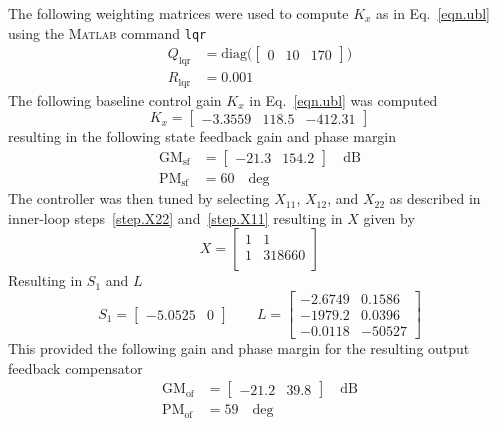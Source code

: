 The following weighting matrices were used to compute $K_{x}$ as in Eq.\ \eqref{eqn.ubl} using the \textsc{Matlab} command \texttt{lqr}
\begin{equation*}
  \begin{aligned}
    Q_{\text{lqr}}&=\text{diag}\bigr(
    \begin{bmatrix}
      0 & 10 & 170
    \end{bmatrix}
    \bigr) \\
    R_{\text{lqr}}&=0.001
  \end{aligned}
\end{equation*}
The following baseline control gain $K_{x}$ in Eq.\ \eqref{eqn.ubl} was computed
\begin{equation*}
  K_{x} =
  \begin{bmatrix}
    -3.3559 & 118.5 & -412.31
  \end{bmatrix}
\end{equation*}
resulting in the following state feedback gain and phase margin
\begin{equation*}
  \begin{aligned}
    \text{GM}_{\text{sf}} &=
    \begin{bmatrix}
      -21.3 & 154.2
    \end{bmatrix}
    \quad \text{dB}\\
    \text{PM}_{\text{sf}} &=
    60
    \quad \text{deg}
  \end{aligned}
\end{equation*}
The controller was then tuned by selecting $X_{11}$, $X_{12}$, and $X_{22}$ as described in inner-loop steps~\ref{step.X22} and~\ref{step.X11} resulting in $X$ given by
\begin{equation*}
  X=
  \begin{bmatrix}
    1 & 1 \\
    1 & 318660 \\
  \end{bmatrix}
\end{equation*}
Resulting in $S_{1}$ and $L$
\begin{equation*}
  S_{1} =
  \begin{bmatrix}
    -5.0525 & 0
  \end{bmatrix}
  \qquad
  L =
  \begin{bmatrix}
    -2.6749 & 0.1586 \\
    -1979.2 & 0.0396 \\
    -0.0118 & -50527
  \end{bmatrix}
\end{equation*}
This provided the following gain and phase margin for the resulting output feedback compensator
\begin{equation*}
  \begin{aligned}
    \text{GM}_{\text{of}}
    &=
    \begin{bmatrix}
      -21.2 & 39.8
    \end{bmatrix}
    \quad \text{dB}\\
    \text{PM}_{\text{of}} &=
    59
    \quad \text{deg}
  \end{aligned}
\end{equation*}

